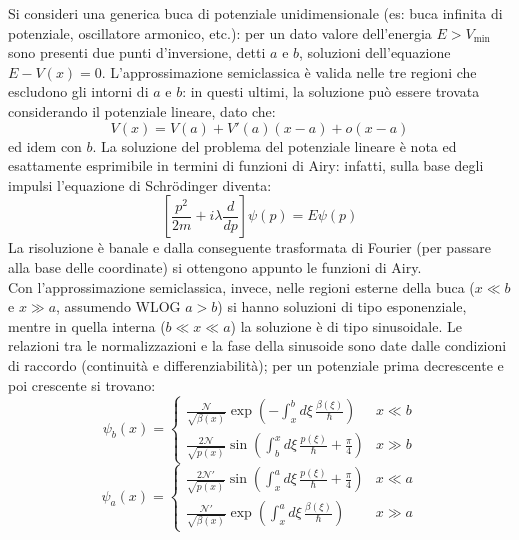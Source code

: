 \begin{example}
	Si consideri una generica buca di potenziale unidimensionale (es: buca infinita di potenziale, oscillatore armonico, etc.): per un dato valore dell'energia $ E > V_{\text{min}} $ sono presenti due punti d'inversione, detti $ a $ e $ b $, soluzioni dell'equazione $ E - V(x) = 0 $. L'approssimazione semiclassica è valida nelle tre regioni che escludono gli intorni di $ a $ e $ b $: in questi ultimi, la soluzione può essere trovata considerando il potenziale lineare, dato che:
	\begin{equation*}
		V(x) = V(a) + V'(a) (x - a) + o(x - a)
	\end{equation*}
	ed idem con $ b $. La soluzione del problema del potenziale lineare è nota ed esattamente esprimibile in termini di funzioni di Airy: infatti, sulla base degli impulsi l'equazione di Schrödinger diventa:
	\begin{equation*}
		\left[ \frac{p^2}{2m} + i \lambda \frac{d}{dp} \right] \psi(p) = E \psi(p)
	\end{equation*}
	La risoluzione è banale e dalla conseguente trasformata di Fourier (per passare alla base delle coordinate) si ottengono appunto le funzioni di Airy.\\
	Con l'approssimazione semiclassica, invece, nelle regioni esterne della buca ($ x \ll b $ e $ x \gg a $, assumendo WLOG $ a > b $) si hanno soluzioni di tipo esponenziale, mentre in quella interna ($ b \ll x \ll a $) la soluzione è di tipo sinusoidale. Le relazioni tra le normalizzazioni e la fase della sinusoide sono date dalle condizioni di raccordo (continuità e differenziabilità); per un potenziale prima decrescente e poi crescente si trovano:
	\begin{equation*}
		\psi_b(x) =
		\begin{cases}
			\frac{\mathcal{N}}{\sqrt{\beta(x)}} \exp \left( - \int_x^b d\xi\, \frac{\beta(\xi)}{\hbar} \right) & x \ll b \\
			\frac{2\mathcal{N}}{\sqrt{p(x)}} \sin \left( \int_b^x d\xi\, \frac{p(\xi)}{\hbar} + \frac{\pi}{4} \right) & x \gg b
		\end{cases}
	\end{equation*}
	\begin{equation*}
		\psi_a(x) =
		\begin{cases}
			\frac{2\mathcal{N}'}{\sqrt{p(x)}} \sin \left( \int_x^a d\xi\, \frac{p(\xi)}{\hbar} + \frac{\pi}{4} \right) & x \ll a \\
			\frac{\mathcal{N}'}{\sqrt{\beta(x)}} \exp \left( \int_x^a d\xi\, \frac{\beta(\xi)}{\hbar} \right) & x \gg a

\end{cases}
\end{equation*}
\end{example}
